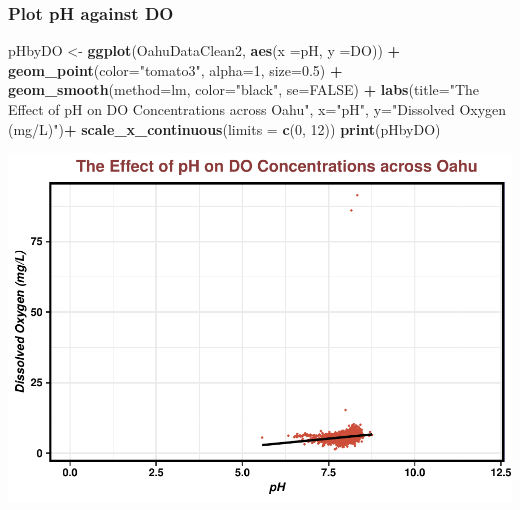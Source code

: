 \documentclass[12pt,]{article}
\newenvironment{Shaded}{\begin{snugshade}}{\end{snugshade}}
\newcommand{\KeywordTok}[1]{\textcolor[rgb]{0.13,0.29,0.53}{\textbf{#1}}}
\newcommand{\DataTypeTok}[1]{\textcolor[rgb]{0.13,0.29,0.53}{#1}}
\newcommand{\DecValTok}[1]{\textcolor[rgb]{0.00,0.00,0.81}{#1}}
\newcommand{\FloatTok}[1]{\textcolor[rgb]{0.00,0.00,0.81}{#1}}
\newcommand{\StringTok}[1]{\textcolor[rgb]{0.31,0.60,0.02}{#1}}
\newcommand{\OtherTok}[1]{\textcolor[rgb]{0.56,0.35,0.01}{#1}}
\newcommand{\OperatorTok}[1]{\textcolor[rgb]{0.81,0.36,0.00}{\textbf{#1}}}
\newcommand{\NormalTok}[1]{#1}
\begin{document}
\subsubsection{Plot pH against DO}\label{plot-ph-against-do}

\begin{Shaded}
\begin{Highlighting}[]
\NormalTok{pHbyDO <-}\StringTok{ }
\StringTok{  }\KeywordTok{ggplot}\NormalTok{(OahuDataClean2, }\KeywordTok{aes}\NormalTok{(}\DataTypeTok{x =}\NormalTok{pH, }\DataTypeTok{y =}\NormalTok{DO)) }\OperatorTok{+}
\StringTok{  }\KeywordTok{geom_point}\NormalTok{(}\DataTypeTok{color=}\StringTok{"tomato3"}\NormalTok{, }\DataTypeTok{alpha=}\DecValTok{1}\NormalTok{, }\DataTypeTok{size=}\FloatTok{0.5}\NormalTok{) }\OperatorTok{+}
\StringTok{  }\KeywordTok{geom_smooth}\NormalTok{(}\DataTypeTok{method=}\NormalTok{lm, }\DataTypeTok{color=}\StringTok{"black"}\NormalTok{, }\DataTypeTok{se=}\OtherTok{FALSE}\NormalTok{) }\OperatorTok{+}
\StringTok{  }\KeywordTok{labs}\NormalTok{(}\DataTypeTok{title=}\StringTok{"The Effect of pH on DO Concentrations across Oahu"}\NormalTok{, }\DataTypeTok{x=}\StringTok{"pH"}\NormalTok{, }\DataTypeTok{y=}\StringTok{"Dissolved Oxygen (mg/L)"}\NormalTok{)}\OperatorTok{+}
\StringTok{   }\KeywordTok{scale_x_continuous}\NormalTok{(}\DataTypeTok{limits =} \KeywordTok{c}\NormalTok{(}\DecValTok{0}\NormalTok{, }\DecValTok{12}\NormalTok{))}
\KeywordTok{print}\NormalTok{(pHbyDO) }
\end{Highlighting}
\end{Shaded}

\includegraphics{Garcia_ENV872_Project_files/figure-latex/unnamed-chunk-31-1.pdf}
\end{document}
